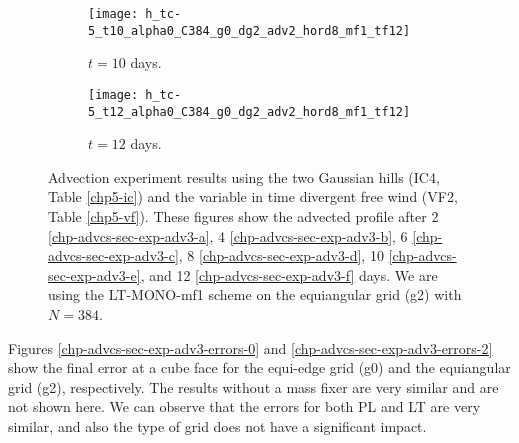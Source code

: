 \begin{figure}[!htb]
	\begin{subfigure}{0.45\textwidth}
		\centering
		\texttt{[image: h\_tc-5\_t10\_alpha0\_C384\_g0\_dg2\_adv2\_hord8\_mf1\_tf12]}
		\caption{$t=10$ days.\label{chp-advcs-sec-exp-adv3-e}}
	\end{subfigure}
	\begin{subfigure}{0.45\textwidth}
		\centering
		\texttt{[image: h\_tc-5\_t12\_alpha0\_C384\_g0\_dg2\_adv2\_hord8\_mf1\_tf12]}
		\caption{$t=12$ days.\label{chp-advcs-sec-exp-adv3-f}}
	\end{subfigure}
	\caption{Advection experiment results using the two Gaussian hills  (IC4, Table \ref{chp5-ic}) and 
		the variable in time divergent free wind (VF2, Table \ref{chp5-vf}).
		These figures show the advected profile after
		2 \eqref{chp-advcs-sec-exp-adv3-a}, 
		4  \eqref{chp-advcs-sec-exp-adv3-b},
		6  \eqref{chp-advcs-sec-exp-adv3-c},
		8  \eqref{chp-advcs-sec-exp-adv3-d},
		10  \eqref{chp-advcs-sec-exp-adv3-e},
		and 12  \eqref{chp-advcs-sec-exp-adv3-f} days.
		We are using the LT-MONO-mf1 scheme on the equiangular grid (g2) with $N=384$.\label{chp-advcs-sec-exp-adv3}}
\end{figure}

\newpage
Figures \ref{chp-advcs-sec-exp-adv3-errors-0} and \ref{chp-advcs-sec-exp-adv3-errors-2} show 
the final error at a cube face for the equi-edge grid (g0) and the equiangular grid (g2), respectively.
The results without a mass fixer are very similar and are not shown here. 
We can observe that the errors for both PL and LT are very similar, and also the type of grid does not have a significant impact.

